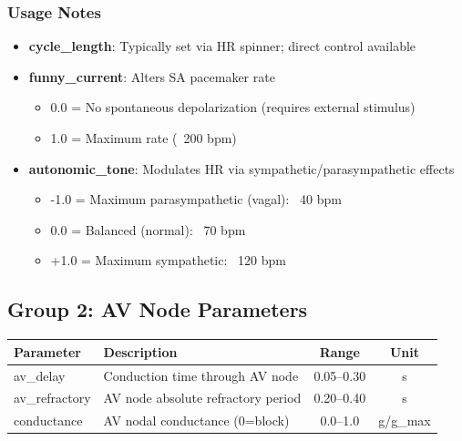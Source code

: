 \documentclass[11pt, a4paper]{article}
\begin{document}
\subsubsection{Usage Notes}
\begin{itemize}
    \item \textbf{cycle\_length}: Typically set via HR spinner; direct control available
    \item \textbf{funny\_current}: Alters SA pacemaker rate
        \begin{itemize}
            \item 0.0 = No spontaneous depolarization (requires external stimulus)
            \item 1.0 = Maximum rate (~200 bpm)
        \end{itemize}
    \item \textbf{autonomic\_tone}: Modulates HR via sympathetic/parasympathetic effects
        \begin{itemize}
            \item -1.0 = Maximum parasympathetic (vagal): ~40 bpm
            \item 0.0 = Balanced (normal): ~70 bpm
            \item +1.0 = Maximum sympathetic: ~120 bpm
        \end{itemize}
\end{itemize}

\subsection{Group 2: AV Node Parameters}

\begin{tabularx}{\textwidth}{|l|X|c|c|}
\hline
\textbf{Parameter} & \textbf{Description} & \textbf{Range} & \textbf{Unit} \\
\hline
av\_delay & Conduction time through AV node & 0.05--0.30 & s \\
av\_refractory & AV node absolute refractory period & 0.20--0.40 & s \\
conductance & AV nodal conductance (0=block) & 0.0--1.0 & g/g\_max \\
\hline
\end{tabularx}
\end{document}
